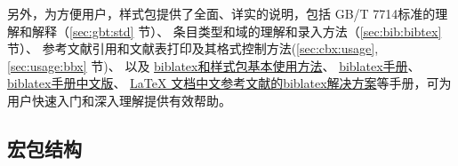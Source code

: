 \documentclass[11pt]{article} %
\begin{document}
\begin{enumerate}
另外，为方便用户，样式包提供了全面、详实的说明，包括
GB/T 7714标准的理解和解释（\ref{sec:gbt:std} 节）、
条目类型和域的理解和录入方法（\ref{sec:bib:bibtex} 节）、
参考文献引用和文献表打印及其格式控制方法(\ref{sec:cbx:usage},\ref{sec:usage:bbx} 节)、
\hypertarget{lab:manual:hyper}{以及}
\href{https://github.com/hushidong/biblatex-gb7714-2015/wiki}{biblatex和样式包基本使用方法}、
\href{https://github.com/plk/biblatex}{biblatex手册}、
\href{https://github.com/hushidong/biblatex-zh-cn}{biblatex手册中文版}、
\href{https://github.com/hushidong/biblatex-solution-to-latex-bibliography}{LaTeX 文档中文参考文献的biblatex解决方案}等手册，可为用户快速入门和深入理解提供有效帮助。

\end{enumerate}


\subsection{宏包结构}
\end{document}
